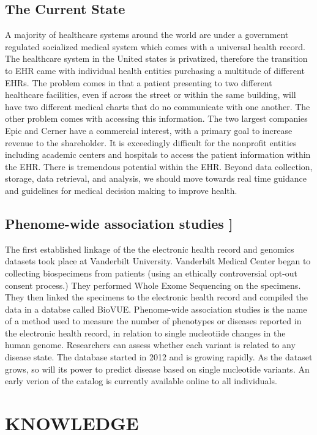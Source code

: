 \documentclass[sigconf]{acmart}
\begin{document}
\subsection{	The Current State}

A majority of healthcare systems around the world are under a
government regulated socialized medical system which comes with a
universal health record. The healthcare system in the United states is
privatized, therefore the transition to EHR came with individual
health entities purchasing a multitude of different EHRs.  The problem
comes in that a patient presenting to two different healthcare
facilities, even if across the street or within the same building,
will have two different medical charts that do no communicate with one
another.  The other problem comes with accessing this information.
The two largest companies Epic and Cerner have a commercial interest,
with a primary goal to increase revenue to the shareholder.  It is
exceedingly difficult for the nonprofit entities including academic
centers and hospitals to access the patient information within the
EHR. There is tremendous potential within the EHR.  Beyond data
collection, storage, data retrieval, and analysis, we should move
towards real time guidance and guidelines for medical decision making
to improve health.

\subsection{Phenome-wide association studies ]}
 The first established linkage of the the electronic health record and genomics datasets took place at Vanderbilt University.  Vanderbilt Medical Center began to collecting biospecimens from patients (using an ethically controversial opt-out consent process.)  They performed Whole Exome Sequencing on the specimens.  They then linked the specimens to the electronic health record and compiled the data in a databse called BioVUE. Phenome-wide association studies is the name of a method used to measure the number of phenotypes or diseases reported in the electronic health record, in relation to single nucleotiide changes in the human genome.  Researchers can assess whether each variant is related to any disease state.  The database started in 2012 and is growing rapidly.  As the dataset grows, so will its power to predict disease based on single nucleotide variants.  An early verion of the catalog is currently available online to all individuals.     
  
\section{KNOWLEDGE}
\end{document}
